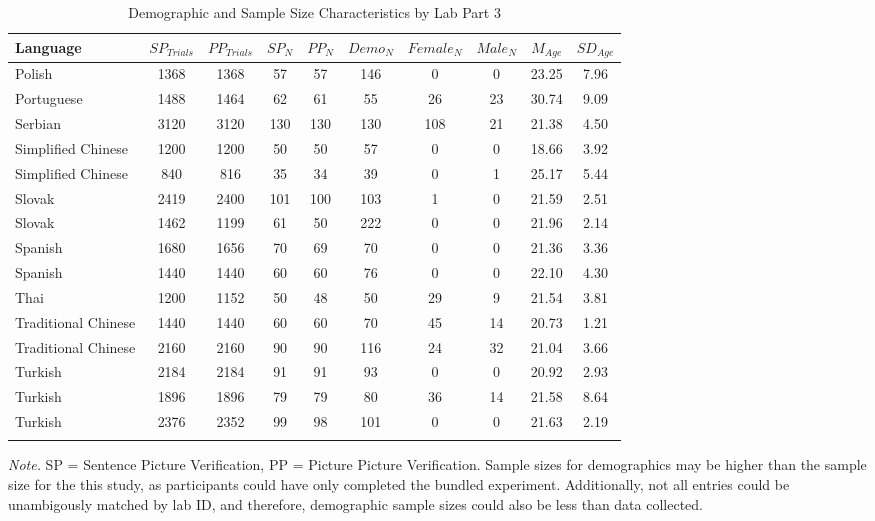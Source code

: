 \documentclass[
  man,floatsintext]{apa7}
\begin{document}
\begin{table}[tbp]

\begin{center}
\begin{threeparttable}

\caption{\label{tab:print-part3}Demographic and Sample Size Characteristics by Lab Part 3}

\footnotesize{

\begin{tabular}{lccccccccc}
\toprule
Language & $SP_{Trials}$ & $PP_{Trials}$ & $SP_N$ & $PP_N$ & $Demo_N$ & $Female_N$ & $Male_N$ & $M_{Age}$ & $SD_{Age}$\\
\midrule
Polish & 1368 & 1368 & 57 & 57 & 146 & 0 & 0 & 23.25 & 7.96\\
Portuguese & 1488 & 1464 & 62 & 61 & 55 & 26 & 23 & 30.74 & 9.09\\
Serbian & 3120 & 3120 & 130 & 130 & 130 & 108 & 21 & 21.38 & 4.50\\
Simplified Chinese & 1200 & 1200 & 50 & 50 & 57 & 0 & 0 & 18.66 & 3.92\\
Simplified Chinese & 840 & 816 & 35 & 34 & 39 & 0 & 1 & 25.17 & 5.44\\
Slovak & 2419 & 2400 & 101 & 100 & 103 & 1 & 0 & 21.59 & 2.51\\
Slovak & 1462 & 1199 & 61 & 50 & 222 & 0 & 0 & 21.96 & 2.14\\
Spanish & 1680 & 1656 & 70 & 69 & 70 & 0 & 0 & 21.36 & 3.36\\
Spanish & 1440 & 1440 & 60 & 60 & 76 & 0 & 0 & 22.10 & 4.30\\
Thai & 1200 & 1152 & 50 & 48 & 50 & 29 & 9 & 21.54 & 3.81\\
Traditional Chinese & 1440 & 1440 & 60 & 60 & 70 & 45 & 14 & 20.73 & 1.21\\
Traditional Chinese & 2160 & 2160 & 90 & 90 & 116 & 24 & 32 & 21.04 & 3.66\\
Turkish & 2184 & 2184 & 91 & 91 & 93 & 0 & 0 & 20.92 & 2.93\\
Turkish & 1896 & 1896 & 79 & 79 & 80 & 36 & 14 & 21.58 & 8.64\\
Turkish & 2376 & 2352 & 99 & 98 & 101 & 0 & 0 & 21.63 & 2.19\\
\bottomrule
\addlinespace
\end{tabular}

}

\begin{tablenotes}[para]
\normalsize{\textit{Note.} SP = Sentence Picture Verification, PP = Picture Picture Verification. Sample sizes for demographics may be higher than the sample size for the this study, as participants could have only completed the bundled experiment. Additionally, not all entries could be unambigously matched by lab ID, and therefore, demographic sample sizes could also be less than data collected.}
\end{tablenotes}

\end{threeparttable}
\end{center}

\end{table}
\end{document}
